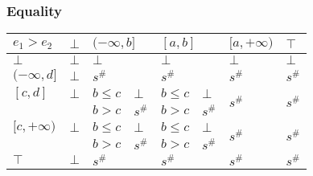 \documentclass{beamer}
\begin{document}
        \begin{frame}
            \frametitle{Equality}
    \begin{table}[]
        \begin{tabular}{|l|l|ll|ll|l|l|}
        \hline
        $e_1 > e_2$    & $\bot$ & \multicolumn{2}{l|}{$(-\infty, b]$} & \multicolumn{2}{l|}{$[a, b]$} & $[a, +\infty)$          & $\top$                  \\ \hline
        $\bot$         & $\bot$ & \multicolumn{2}{l|}{$\bot$}         & \multicolumn{2}{l|}{$\bot$}   & $\bot$                  & $\bot$                  \\ \hline
        $(-\infty, d]$ & $\bot$ & \multicolumn{2}{l|}{$s^\#$}         & \multicolumn{2}{l|}{$s^\#$}   & $s^\#$                  & $s^\#$                  \\ \hline
        $[c, d]$       & $\bot$ & $b \le c$          & $\bot$         & $b \le c$       & $\bot$      & \multirow{2}{*}{$s^\#$} & \multirow{2}{*}{$s^\#$} \\
                        &        & $b > c$            & $s^\#$         & $b > c$         & $s^\#$      &                         &                         \\ \hline
        $[c, +\infty)$ & $\bot$ & $b \le c$          & $\bot$         & $b \le c$       & $\bot$      & \multirow{2}{*}{$s^\#$} & \multirow{2}{*}{$s^\#$} \\
                        &        & $b > c$            & $s^\#$         & $b > c$         & $s^\#$      &                         &                         \\ \hline
        $\top$         & $\bot$ & \multicolumn{2}{l|}{$s^\#$}         & \multicolumn{2}{l|}{$s^\#$}   & $s^\#$                  & $s^\#$                  \\ \hline
        \end{tabular}
        \end{table}
    \end{frame}
    
\end{document}
